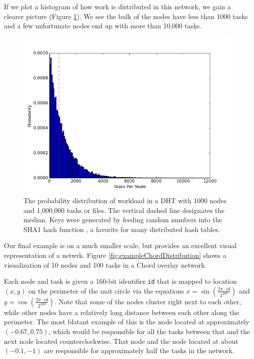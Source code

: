 If we plot a histogram of how work is distributed in this network, we gain a clearer picture (Figure \ref{fig:workloadDistribution}).
We see the bulk of the nodes have less than 1000 tasks and a few unfortunate nodes end up with more than 10,000 tasks.


\begin{figure}
	\centering
	\includegraphics[width=0.7\linewidth]{figs/workloadDistribution}
	\caption[foo]{The probability distribution of workload in a DHT with 1000 nodes and 1,000,000 tasks or files.  The vertical dashed line designates the median.  Keys were generated by feeding random numbers into the SHA1 hash function \cite{sha1}, a favorite for many distributed hash tables.}
	\label{fig:workloadDistribution}
\end{figure}

Our final example is on a much smaller scale, but provides an excellent visual representation of a netwrk.
Figure \ref{fig:exampleChordDistribution} shows a visualization of 10 nodes and 100 tasks in a Chord overlay network.

Each node and task is given a 160-bit identifier \texttt{id} that is mapped to location $ (x,y) $ on the perimeter of the unit circle via the equations $ x = \sin\left( \frac{ 2 \pi \cdot id}{2^{160}} \right)$ and $ y = \cos\left( \frac{ 2 \pi \cdot id}{2^{160}} \right)$. 
Note that some of the nodes cluster right next to each other, while other nodes have a relatively long distance between each other along the perimeter.  
The most blatant example of this is the node located at approximately $(-0.67, 0.75)$, which would be responsible for all the tasks between that and the next node located counterclockwise.
That node and the node located at about $(-0.1, -1)$ are responsible for approximately half the tasks in the network.

